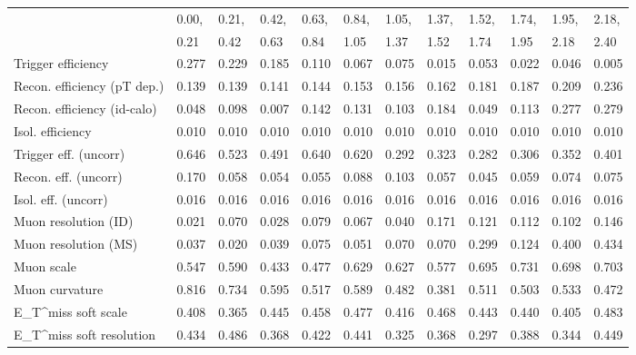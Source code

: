 \begin{tabular}{l|p{0.6cm}p{0.6cm}p{0.6cm}p{0.6cm}p{0.6cm}p{0.6cm}p{0.6cm}p{0.6cm}p{0.6cm}p{0.6cm}p{0.6cm}}
\hline
   & 0.00, & 0.21, & 0.42, & 0.63, & 0.84, & 1.05, & 1.37, & 1.52, & 1.74, & 1.95, & 2.18,  \\ 
   & 0.21 & 0.42 & 0.63 & 0.84 & 1.05 & 1.37 & 1.52 & 1.74 & 1.95 & 2.18 & 2.40  \\ 
\hline
Trigger efficiency                       & 0.277 & 0.229 & 0.185 & 0.110 & 0.067 & 0.075 & 0.015 & 0.053 & 0.022 & 0.046 & 0.005 \\
Recon. efficiency (pT dep.)              & 0.139 & 0.139 & 0.141 & 0.144 & 0.153 & 0.156 & 0.162 & 0.181 & 0.187 & 0.209 & 0.236 \\
Recon. efficiency (id-calo)              & 0.048 & 0.098 & 0.007 & 0.142 & 0.131 & 0.103 & 0.184 & 0.049 & 0.113 & 0.277 & 0.279 \\
Isol. efficiency                         & 0.010 & 0.010 & 0.010 & 0.010 & 0.010 & 0.010 & 0.010 & 0.010 & 0.010 & 0.010 & 0.010 \\
Trigger eff. (uncorr)                    & 0.646 & 0.523 & 0.491 & 0.640 & 0.620 & 0.292 & 0.323 & 0.282 & 0.306 & 0.352 & 0.401 \\
Recon. eff. (uncorr)                     & 0.170 & 0.058 & 0.054 & 0.055 & 0.088 & 0.103 & 0.057 & 0.045 & 0.059 & 0.074 & 0.075 \\
Isol. eff. (uncorr)                      & 0.016 & 0.016 & 0.016 & 0.016 & 0.016 & 0.016 & 0.016 & 0.016 & 0.016 & 0.016 & 0.016 \\
Muon resolution (ID)                     & 0.021 & 0.070 & 0.028 & 0.079 & 0.067 & 0.040 & 0.171 & 0.121 & 0.112 & 0.102 & 0.146 \\
Muon resolution (MS)                     & 0.037 & 0.020 & 0.039 & 0.075 & 0.051 & 0.070 & 0.070 & 0.299 & 0.124 & 0.400 & 0.434 \\
Muon scale                               & 0.547 & 0.590 & 0.433 & 0.477 & 0.629 & 0.627 & 0.577 & 0.695 & 0.731 & 0.698 & 0.703 \\
Muon curvature                           & 0.816 & 0.734 & 0.595 & 0.517 & 0.589 & 0.482 & 0.381 & 0.511 & 0.503 & 0.533 & 0.472 \\
E_{T}^{miss} soft scale                  & 0.408 & 0.365 & 0.445 & 0.458 & 0.477 & 0.416 & 0.468 & 0.443 & 0.440 & 0.405 & 0.483 \\
E_{T}^{miss} soft resolution             & 0.434 & 0.486 & 0.368 & 0.422 & 0.441 & 0.325 & 0.368 & 0.297 & 0.388 & 0.344 & 0.449 \\

\end{tabular}
